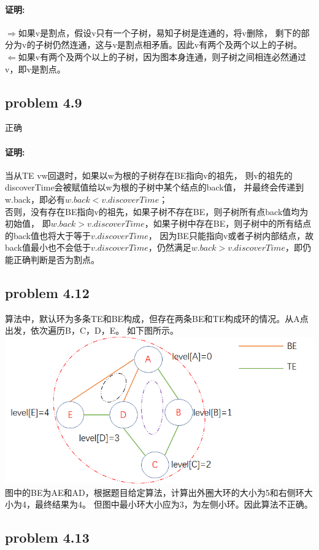 \documentclass[11pt,a4paper,oneside,oldfontcommands]{ctexart}
\begin{document}
\paragraph{证明:}
\textbf{$\Rightarrow$}如果v是割点，假设v只有一个子树，易知子树是连通的，将v删除，
剩下的部分为v的子树仍然连通，这与v是割点相矛盾。因此v有两个及两个以上的子树。\\
\textbf{$\Leftarrow$}如果v有两个及两个以上的子树，因为图本身连通，则子树之间相连必然通过v，即v是割点。
{\subsection*{problem 4.9}}
正确
\paragraph{证明:}
当从TE vw回退时，如果以w为根的子树存在BE指向v的祖先，
则v的祖先的discoverTime会被赋值给以w为根的子树中某个结点的back值，
并最终会传递到w.back，即必有$w.back<v.discoverTime$；\\
\hspace*{20pt}否则，没有存在BE指向v的祖先，如果子树不存在BE，则子树所有点back值均为初始值，
即$w.back>v.discoverTime$，如果子树中存在BE，则子树中的所有结点的back值也将大于等于$v.discoverTime$，
因为BE只能指向v或者子树内部结点，故back值最小也不会低于$v.discoverTime$，仍然满足$w.back>v.discoverTime$，即仍能正确判断是否为割点。
{\subsection*{problem 4.12}}
算法中，默认环为多条TE和BE构成，但存在两条BE和TE构成环的情况。从A点出发，依次遍历B，C，D，E。
如下图所示。\\
\includegraphics{4-12.png}\\
图中的BE为AE和AD，根据题目给定算法，计算出外圈大环的大小为5和右侧环大小为4，最终结果为4。
但图中最小环大小应为3，为左侧小环。因此算法不正确。
\newpage
{\subsection*{problem 4.13}}
\end{document}

